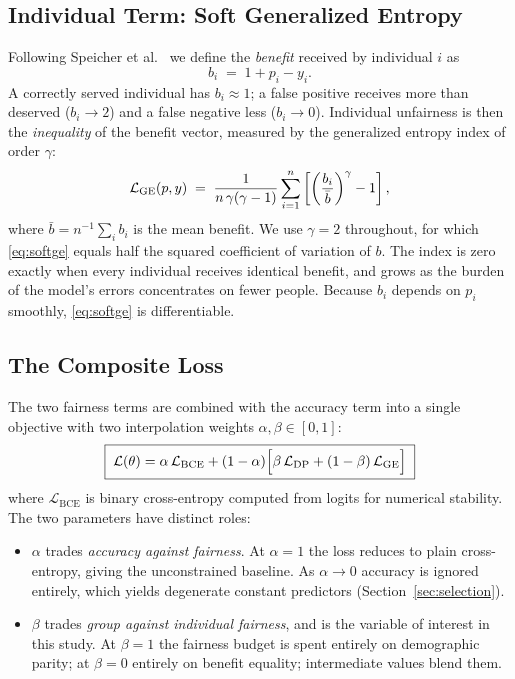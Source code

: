 \subsection{Individual Term: Soft Generalized Entropy}

Following Speicher et al.~\cite{speicher2018unified} we define the
\emph{benefit} received by individual $i$ as
\begin{equation}
b_i \;=\; 1 + p_i - y_i .
\label{eq:benefit}
\end{equation}
A correctly served individual has $b_i \approx 1$; a false positive receives
more than deserved ($b_i \to 2$) and a false negative less ($b_i \to 0$).
Individual unfairness is then the \emph{inequality} of the benefit vector,
measured by the generalized entropy index of order $\gamma$:
\begin{equation}
\mathcal{L}_{\mathrm{GE}}(p,y) \;=\; \frac{1}{n\,\gamma(\gamma-1)} \sum_{i=1}^{n}
\left[ \left( \frac{b_i}{\bar{b}} \right)^{\gamma} - 1 \right],
\label{eq:softge}
\end{equation}
where $\bar{b} = n^{-1}\sum_i b_i$ is the mean benefit.
We use $\gamma = 2$ throughout, for which \eqref{eq:softge} equals half the
squared coefficient of variation of $b$. The index is zero exactly when every
individual receives identical benefit, and grows as the burden of the model's
errors concentrates on fewer people. Because $b_i$ depends on $p_i$ smoothly,
\eqref{eq:softge} is differentiable.

\subsection{The Composite Loss}

The two fairness terms are combined with the accuracy term into a single
objective with two interpolation weights $\alpha, \beta \in [0,1]$:
\begin{equation}
\boxed{\;
\mathcal{L}(\theta)
= \alpha\,\mathcal{L}_{\mathrm{BCE}}
+ (1-\alpha)\Big[\beta\,\mathcal{L}_{\mathrm{DP}} + (1-\beta)\,\mathcal{L}_{\mathrm{GE}}\Big] \;}
\label{eq:composite}
\end{equation}
where $\mathcal{L}_{\mathrm{BCE}}$ is binary cross-entropy computed from
logits for numerical stability. The two parameters have distinct roles:

\begin{itemize}
\item $\alpha$ trades \emph{accuracy against fairness}. At $\alpha=1$ the loss
      reduces to plain cross-entropy, giving the unconstrained baseline. As
      $\alpha \to 0$ accuracy is ignored entirely, which yields degenerate
      constant predictors (Section~\ref{sec:selection}).
\item $\beta$ trades \emph{group against individual fairness}, and is the
      variable of interest in this study. At $\beta=1$ the fairness budget is
      spent entirely on demographic parity; at $\beta=0$ entirely on benefit
      equality; intermediate values blend them.
\end{itemize}

